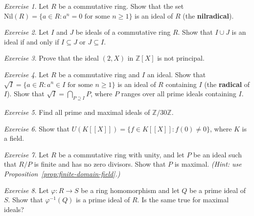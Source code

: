 \documentclass[12pt,a4paper,openany]{book}
\theoremstyle{definition}
\theoremstyle{remark}
\newtheorem{exercise}{Exercise}[chapter]
\begin{document}
\begin{exercise}\label{exo:ring-4}
Let $R$ be a commutative ring. Show that the set $\mathrm{Nil}(R)=\{a\in R : a^n=0 \text{ for some } n\geq 1\}$ is an ideal of $R$ (the \textbf{nilradical}).
\end{exercise}

\begin{exercise}\label{exo:ring-5}
Let $I$ and $J$ be ideals of a commutative ring $R$. Show that $I\cup J$ is an ideal if and only if $I\subseteq J$ or $J\subseteq I$.
\end{exercise}

\begin{exercise}\label{exo:ring-6}
Prove that the ideal $(2,X)$ in $\mathbb{Z}[X]$ is not principal.
\end{exercise}

\begin{exercise}\label{exo:ring-7}
Let $R$ be a commutative ring and $I$ an ideal. Show that $\sqrt{I}=\{a\in R : a^n\in I \text{ for some } n\geq 1\}$ is an ideal of $R$ containing $I$ (the \textbf{radical} of $I$). Show that $\sqrt{I}=\bigcap_{P\supseteq I}P$, where $P$ ranges over all prime ideals containing $I$.
\end{exercise}

\begin{exercise}\label{exo:ring-8}
Find all prime and maximal ideals of $\mathbb{Z}/30\mathbb{Z}$.
\end{exercise}

\begin{exercise}\label{exo:ring-9}
Show that $U(K[[X]])=\{f\in K[[X]] : f(0)\neq 0\}$, where $K$ is a field.
\end{exercise}

\begin{exercise}\label{exo:ring-10}
Let $R$ be a commutative ring with unity, and let $P$ be an ideal such that $R/P$ is finite and has no zero divisors. Show that $P$ is maximal. \textit{(Hint: use Proposition~\ref{prop:finite-domain-field}.)}
\end{exercise}

\begin{exercise}\label{exo:ring-11}
Let $\varphi\colon R\to S$ be a ring homomorphism and let $Q$ be a prime ideal of $S$. Show that $\varphi^{-1}(Q)$ is a prime ideal of $R$. Is the same true for maximal ideals?
\end{exercise}

\medskip
\begin{center}
\end{center}
\end{document}
